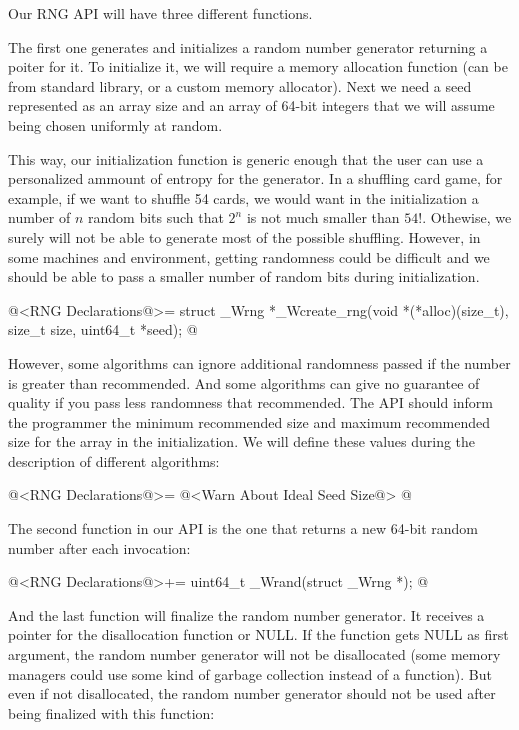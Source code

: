 
Our RNG API will have three different functions.

The first one generates and initializes a random number generator
returning a poiter for it. To initialize it, we will require a memory
allocation function (can be  from standard library,
or a custom memory allocator). Next we need a seed represented as an
array size and an array of 64-bit integers that we will assume being
chosen uniformly at random.

This way, our initialization function is generic enough that the user
can use a personalized ammount of entropy for the generator. In a
shuffling card game, for example, if we want to shuffle 54 cards, we
would want in the initialization a number of $n$ random bits such that
$2^n$ is not much smaller than $54!$. Othewise, we surely will not be
able to generate most of the possible shuffling. However, in some
machines and environment, getting randomness could be difficult and we
should be able to pass a smaller number of random bits during
initialization.

\iniciocodigo
@<RNG Declarations@>=
struct _Wrng *_Wcreate_rng(void *(*alloc)(size_t), size_t size, uint64_t *seed);
@
\fimcodigo

However, some algorithms can ignore additional randomness passed if
the number is greater than recommended. And some algorithms can give
no guarantee of quality if you pass less randomness that
recommended. The API should inform the programmer the minimum
recommended size and maximum recommended size for the array in the
initialization. We will define these values during the description of
different algorithms:

\iniciocodigo
@<RNG Declarations@>=
@<Warn About Ideal Seed Size@>
@
\fimcodigo

The second function in our API is the one that returns a new 64-bit
random number after each invocation:

\iniciocodigo
@<RNG Declarations@>+=
uint64_t _Wrand(struct _Wrng *);
@
\fimcodigo

And the last function will finalize the random number generator. It
receives a pointer for the disallocation function or NULL. If the
function gets NULL as first argument, the random number generator will
not be disallocated (some memory managers could use some kind of
garbage collection instead of a  function). But even
if not disallocated, the random number generator should not be used
after being finalized with this function:

